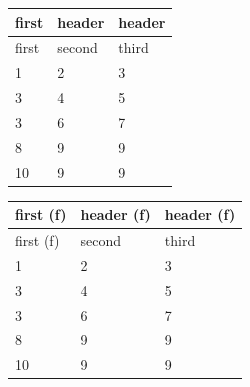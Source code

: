 \documentclass[11pt,a4paper]{article}
\begin{document}
\begin{table}[h]
\begin{tabular}{|l|l|l|}
\hline
first  & header & header \\ \hline
first  & second  & third \\ \hline
1 & 2 & 3 \\ \hline
3 & 4 & 5 \\ \hline
3 & 6 & 7 \\ \hline
8 & 9 & 9 \\ \hline
10 & 9 & 9 \\ \hline
\end{tabular}
\end{table}

\begin{table}[h]
\begin{tabular}{|l|l|l|}
\hline
first (f) & header (f) & header (f) \\ \hline
first (f) & second  & third \\ \hline
1 & 2 & 3 \\ \hline
3 & 4 & 5 \\ \hline
3 & 6 & 7 \\ \hline
8 & 9 & 9 \\ \hline
10 & 9 & 9 \\ \hline
\end{tabular}
\end{table}
\end{document}
